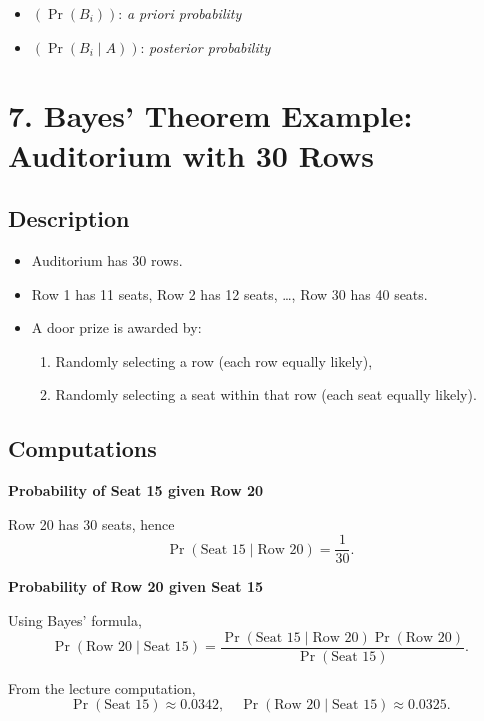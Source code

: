 \documentclass[11pt]{article}
\begin{document}
\begin{itemize}
\item $(\Pr(B_i))$: \emph{a priori probability}
\item $(\Pr(B_i \mid A))$: \emph{posterior probability}
\end{itemize}

\section*{7. Bayes’ Theorem Example: Auditorium with 30 Rows}

\subsection*{Description}

\begin{itemize}
\item Auditorium has 30 rows.
\item Row 1 has 11 seats, Row 2 has 12 seats, \dots, Row 30 has 40 seats.
\item A door prize is awarded by:
\begin{enumerate}
\item Randomly selecting a row (each row equally likely),
\item Randomly selecting a seat within that row (each seat equally likely).
\end{enumerate}
\end{itemize}

\subsection*{Computations}

\textbf{Probability of Seat 15 given Row 20}

Row 20 has 30 seats, hence
\[
\Pr(\text{Seat 15} \mid \text{Row 20}) = \frac{1}{30}.
\]

\textbf{Probability of Row 20 given Seat 15}

Using Bayes’ formula,
\[
\Pr(\text{Row 20} \mid \text{Seat 15})
= \frac{\Pr(\text{Seat 15} \mid \text{Row 20}) \Pr(\text{Row 20})}
{\Pr(\text{Seat 15})}.
\]

From the lecture computation,
\[
\Pr(\text{Seat 15}) \approx 0.0342,
\quad
\Pr(\text{Row 20} \mid \text{Seat 15}) \approx 0.0325.
\]
\end{document}
